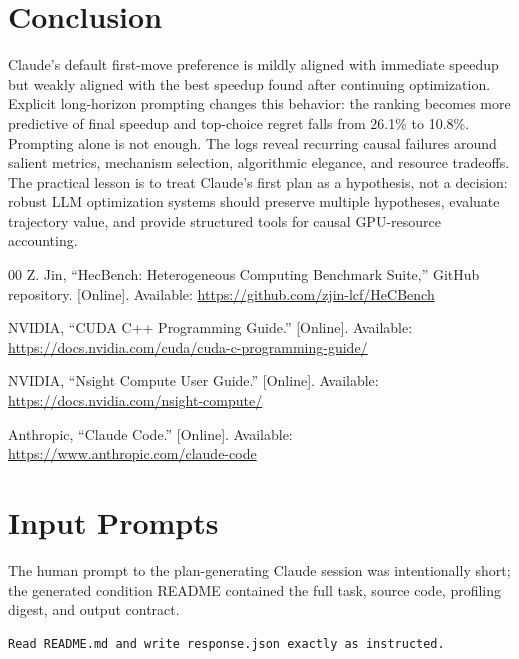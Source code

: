 \documentclass[conference]{IEEEtran}
\newcommand{\mainbodyendpage}{?}
\begin{document}
\section{Conclusion}

Claude's default first-move preference is mildly aligned with immediate
speedup but weakly aligned with the best speedup found after continuing
optimization. Explicit long-horizon prompting changes this behavior: the
ranking becomes more predictive of final speedup and top-choice regret falls
from 26.1\% to 10.8\%. Prompting alone is not enough. The logs reveal recurring
causal failures around salient metrics, mechanism selection, algorithmic
elegance, and resource tradeoffs. The practical lesson is to treat Claude's
first plan as a hypothesis, not a decision: robust LLM optimization systems
should preserve multiple hypotheses, evaluate trajectory value, and provide
structured tools for causal GPU-resource accounting.

\begin{thebibliography}{00}
Z. Jin, ``HecBench: Heterogeneous Computing Benchmark Suite,'' GitHub
repository. [Online]. Available:
\url{https://github.com/zjin-lcf/HeCBench}

NVIDIA, ``CUDA C++ Programming Guide.'' [Online]. Available:
\url{https://docs.nvidia.com/cuda/cuda-c-programming-guide/}

NVIDIA, ``Nsight Compute User Guide.'' [Online]. Available:
\url{https://docs.nvidia.com/nsight-compute/}

Anthropic, ``Claude Code.'' [Online]. Available:
\url{https://www.anthropic.com/claude-code}
\end{thebibliography}

\clearpage
\xdef\mainbodyendpage{\thepage}

\appendices

\section{Input Prompts}

The human prompt to the plan-generating Claude session was intentionally short;
the generated condition README contained the full task, source code, profiling
digest, and output contract.

\begin{lstlisting}
Read README.md and write response.json exactly as instructed.
\end{lstlisting}
\end{document}
